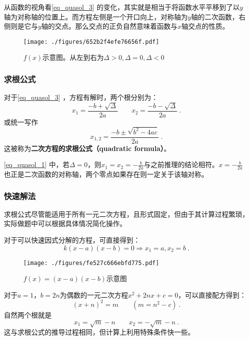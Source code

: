 从函数的视角看\autoref{eq_quasol_3} 的变化，其实就是相当于将函数水平平移到了以$y$轴为对称轴的位置上。而方程左侧是一个开口向上，对称轴为$y$轴的二次函数，右侧则是它与$y$轴的交点。那么交点的正负自然意味着函数与$x$轴交点的性质。

\begin{figure}[ht]
\centering
\texttt{[image: ./figures/652b2f4efe76656f.pdf]}
\caption{$f(x)$示意图。从左到右为$\Delta > 0, \Delta = 0, \Delta < 0$} \label{fig_quasol_1}
\end{figure}

\subsubsection{求根公式}

对于\autoref{eq_quasol_3} ，方程有解时，两个根分别为：
\begin{equation}\label{eq_quasol_1}
x_1=\frac{-b+\sqrt{\Delta}}{2a}\qquad x_2=\frac{-b-\sqrt{\Delta}}{2a}~.
\end{equation}
或统一写作
\begin{equation}
x_{1,2} = \frac{-b \pm \sqrt{b^2 - 4ac}}{2a}~.
\end{equation}
这被称为\textbf{二次方程的求根公式（quadratic formula）}。

\autoref{eq_quasol_1} 中，若$\Delta = 0$，则$\displaystyle x_1=x_2=-\frac{b}{2a}$与之前推理的结论相符。$\displaystyle x=-\frac{b}{2a}$也正是二次函数的对称轴，两个零点如果存在则一定关于该轴对称。


\subsubsection{快速解法}

求根公式尽管能适用于所有一元二次方程，且形式固定，但由于其计算过程繁琐，实际做题中可以根据具体情况简化操作。

对于可以快速因式分解的方程，可直接得到：
$$k(x-a)(x-b)=0\Rightarrow x_1=a, x_2=b~.$$
\begin{figure}[ht]
\centering
\texttt{[image: ./figures/fe527c666ebfd775.pdf]}
\caption{$f(x)=(x-a)(x-b)$示意图} \label{fig_quasol_2}
\end{figure}

对于$a=1$，$b=2n$为偶数的一元二次方程$x^2+2nx+c=0$，可以直接配方得到：
\begin{equation}
(x+n)^2=m\qquad(m=n^2-c)~.
\end{equation}
自然两个根就是
\begin{equation}
x_1=\sqrt{m}-n\qquad x_2=-\sqrt{m}-n~.
\end{equation}
这与求根公式的推导过程相同，但计算上利用特殊条件快一些。

